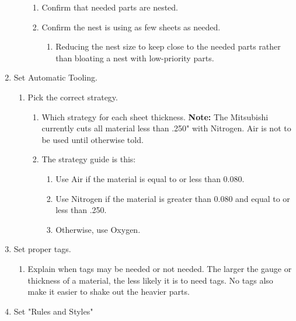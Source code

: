 \documentclass[11pt, a4paper, oneside]{report}
\begin{document}
\begin{enumerate}
\begin{enumerate}
                \begin{enumerate}
                    \item Confirm that needed parts are nested.
                    \item Confirm the nest is using as few sheets as needed.
                        \begin{enumerate}
                            \item Reducing the nest size to keep close to the needed parts rather than bloating a nest with low-priority parts.
                        \end{enumerate}
                \end{enumerate}
        \end{enumerate}
    \item Set Automatic Tooling.
        \begin{enumerate}
            \item Pick the correct strategy.
                \begin{enumerate}
                    \item Which strategy for each sheet thickness. \textbf{Note:} The Mitsubishi currently cuts all material less than .250" with Nitrogen. Air is not to be used until otherwise told.
                    \item The strategy guide is this:
                        \begin{enumerate}
                            \item Use Air if the material is equal to or less than 0.080.
                            \item Use Nitrogen if the material is greater than 0.080 and equal to or less than .250.
                            \item Otherwise, use Oxygen.
                        \end{enumerate}
                \end{enumerate}
        \end{enumerate}
    \item Set proper tags.
        \begin{enumerate}
            \item Explain when tags may be needed or not needed. The larger the gauge or thickness of a material, the less likely it is to need tags. No tags also make it easier to shake out the heavier parts.
        \end{enumerate}
    \item Set "Rules and Styles"

\end{enumerate}
\end{document}

